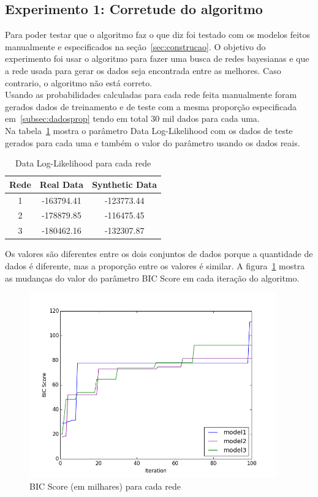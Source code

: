 \subsection{Experimento 1: Corretude do algoritmo}
\label{subsec:exp1}
	Para poder testar que o algoritmo faz o que diz foi testado com os modelos feitos manualmente e especificados na seção~\ref{sec:construcao}. O objetivo do experimento foi usar o algoritmo para fazer uma busca de redes bayesianas e que a rede usada para gerar os dados seja encontrada entre as melhores. Caso contrario, o algoritmo não está correto.
	\\
	Usando as probabilidades calculadas para cada rede feita manualmente foram gerados dados de treinamento e de teste com a mesma proporção especificada em~\ref{subsec:dadosprop} tendo em total 30 mil dados para cada uma.
	\\
	Na tabela~\ref{tab:loglike} mostra o parâmetro Data Log-Likelihood com os dados de teste gerados para cada uma e também o valor do parâmetro usando os dados reais.
	\begin{table}[ h ]
		\centering
		\begin{tabular}{ | c | c | c | }
			\hline
			Rede & Real Data & Synthetic Data \\ \hline
			1 & -163794.41 & -123773.44 \\ \hline
			2 & -178879.85 & -116475.45 \\ \hline
			3 & -180462.16 & -132307.87 \\ \hline
		\end{tabular}
		\caption{Data Log-Likelihood para cada rede}
		\label{tab:loglike}
	\end{table}
	Os valores são diferentes entre os dois conjuntos de dados porque a quantidade de dados é diferente, mas a proporção entre os valores é similar. A figura~\ref{fig:corretude} mostra as mudanças do valor do parâmetro BIC Score em cada iteração do algoritmo.
	\begin{figure}[H]
		\centering
		\includegraphics[height=8cm]{images/synt_data}
		\caption{BIC Score (em milhares) para cada rede}
		\label{fig:corretude}
	\end{figure}
